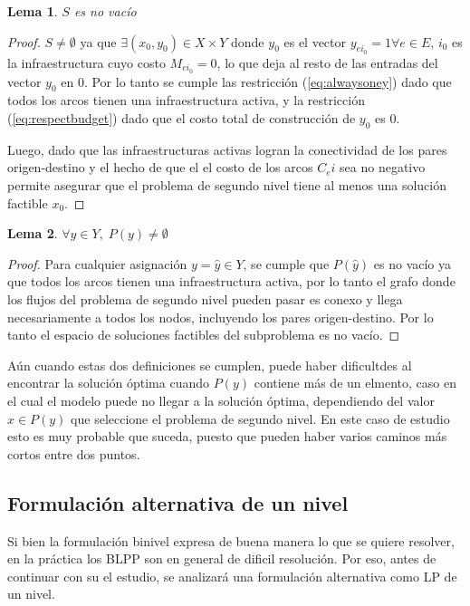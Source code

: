 \documentclass{article}
\newtheorem{lemma}{Lema}
\begin{document}
  \begin{lemma}$S$ es no vacío
  \end{lemma}

  \begin{proof}
    $S \neq \emptyset$ ya que $\exists (x_0, y_0) \in X \times Y$ donde $y_0$ es el vector $y_{ei_0} = 1 \forall e \in E$, $i_0$ es la infraestructura cuyo costo $M_{ei_0} = 0$, lo que deja al resto de las entradas del vector $y_0$ en $0$. Por lo tanto se cumple las restricción (\ref{eq:alwaysoney}) dado que todos los arcos tienen una infraestructura activa, y la restricción (\ref{eq:respectbudget}) dado que el costo total de construcción de $y_0$ es $0$.

    Luego, dado que las infraestructuras activas logran la conectividad de los pares origen-destino y el hecho de que el el costo de los arcos $C_ei$ sea no negativo permite asegurar que el problema de segundo nivel tiene al menos una solución factible $x_0$.
  \end{proof}

  \begin{lemma}$\forall y \in Y,\; P(y) \neq \emptyset$
  \end{lemma}

  \begin{proof}
    Para cualquier asignación $y = \hat{y} \in Y$, se cumple que $P(\hat{y})$ es no vacío ya que todos los arcos tienen una infraestructura activa, por lo tanto el grafo donde los flujos del problema de segundo nivel pueden pasar es conexo y llega necesariamente a todos los nodos, incluyendo los pares origen-destino. Por lo tanto el espacio de soluciones factibles del subproblema es no vacío. 
  \end{proof}

  Aún cuando estas dos definiciones se cumplen, puede haber dificultdes al encontrar la solución óptima cuando $P(y)$ contiene más de un elmento, caso en el cual el modelo puede no llegar a la solución óptima, dependiendo del valor $x \in P(y)$ que seleccione el problema de segundo nivel. En este caso de estudio esto es muy probable que suceda, puesto que pueden haber varios caminos más cortos entre dos puntos.

  \subsection*{Formulación alternativa de un nivel}

  Si bien la formulación binivel expresa de buena manera lo que se quiere resolver, en la práctica los BLPP son en general de dificil resolución. Por eso, antes de continuar con su el estudio, se analizará una formulación alternativa como LP de un nivel.
\end{document}

